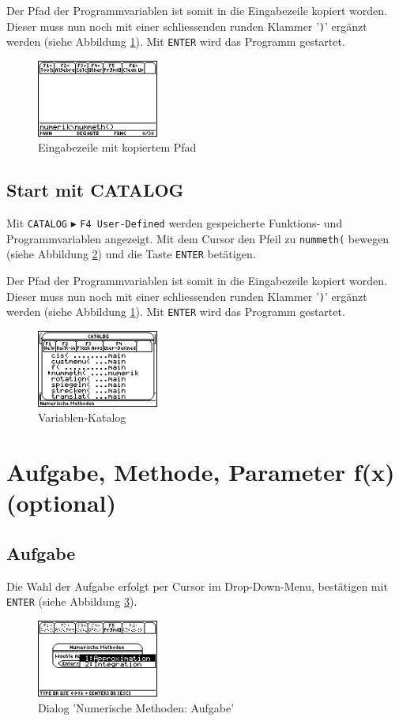 \documentclass[a5paper,9pt]{scrreprt}
\begin{document}
\newpage
Der Pfad der Programmvariablen ist somit in die Eingabezeile kopiert worden. Dieser muss nun noch mit einer schliessenden runden Klammer '\verb|)|' erg\"anzt werden (siehe Abbildung \ref{fig:CLI}). Mit \verb|ENTER| wird das Programm gestartet.
\begin{figure}[h]
  \centering
  \includegraphics[width=4cm]{img/nummeth_image003.png}
  \caption{Eingabezeile mit kopiertem Pfad}
  \label{fig:CLI}
\end{figure}

\subsection*{Start mit CATALOG}
Mit \verb|CATALOG| $\blacktriangleright$ \verb|F4 User-Defined| werden gespeicherte Funk­tions- und Programmvariablen an­ge­zeigt. Mit dem Cursor den Pfeil zu \verb|nummeth(| bewegen (siehe Abbildung \ref{fig:CATALOG}) und die Taste \verb|ENTER| bet\"atigen.

Der Pfad der Programmvariablen ist somit in die Eingabezeile kopiert worden. Dieser muss nun noch mit einer schliessenden runden Klammer '\verb|)|' erg\"anzt werden (siehe Abbildung \ref{fig:CLI}). Mit \verb|ENTER| wird das Programm gestartet.
\begin{figure}[h]
  \centering
  \includegraphics[width=4cm]{img/nummeth_image005.png}
  \caption{Variablen-Katalog}
  \label{fig:CATALOG}
\end{figure}

\newpage
\section{Aufgabe, Methode, Parameter f(x) (optional)}
\subsection*{Aufgabe}
Die Wahl der Aufgabe erfolgt per Cursor im Drop-Down-Menu, best\"atigen mit \verb|ENTER| (siehe Abbildung \ref{fig:Aufgabe}).
\begin{figure}[h]
  \centering
  \includegraphics[width=4cm]{img/nummeth_image008.png}
  \caption{Dialog 'Numerische Methoden: Aufgabe’}
  \label{fig:Aufgabe}
\end{figure}
\end{document}
